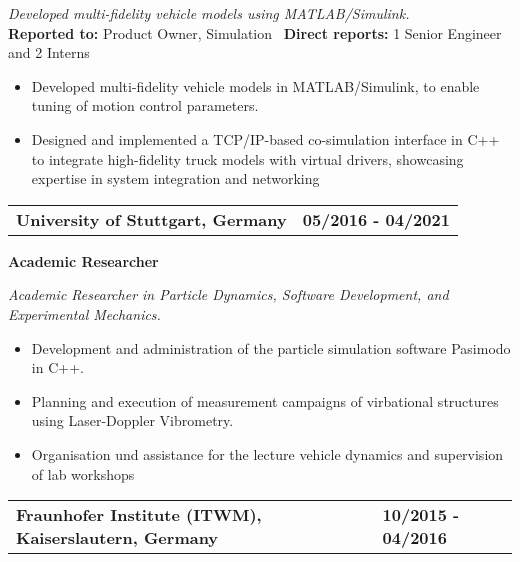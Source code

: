 \documentclass[a4paper,10pt]{article}
\begin{document}
\vspace{0.2cm}
\noindent
\textit{Developed multi-fidelity vehicle models using MATLAB/Simulink.}\\

\vspace{-0.3cm}
\noindent
\textbf{Reported to:} Product Owner, Simulation \, \textbf{Direct reports:} 1 Senior Engineer and 2 Interns\,
\begin{itemize}[itemsep=0pt, topsep=5pt]
    \item Developed multi-fidelity vehicle models in MATLAB/Simulink, to enable tuning of motion control parameters.
  \item Designed and implemented a TCP/IP-based co-simulation interface in C++ to integrate high-fidelity truck models with virtual drivers, showcasing expertise in system integration and networking
\end{itemize}

\vspace{0.3cm}
\noindent
\begin{tabular}{ @{\hskip 0pt}m{} >{\raggedleft\arraybackslash}p{} }
    \noindent\textbf{University of Stuttgart, Germany} & \textbf{05/2016 - 04/2021}
\end{tabular}

\noindent
\colorbox{gray!40}{%
    \parbox{0.99\textwidth}{%
        \textcolor{highlightcolor}{\textbf{Academic Researcher}}
    }%
}

\vspace{0.2cm}
\noindent
\textit{Academic Researcher in Particle Dynamics, Software Development, and Experimental Mechanics.}\\
\vspace{-0.4cm}
\noindent
\begin{itemize}[itemsep=0pt, topsep=5pt]
    \item Development and administration of the particle simulation
        software Pasimodo in C++.
    \item Planning and execution of measurement campaigns of
        virbational structures using Laser-Doppler Vibrometry.
    \item Organisation und assistance for the lecture vehicle
        dynamics and supervision of lab workshops
\end{itemize}

\vspace{0.3cm}
\noindent
\begin{tabular}{ @{\hskip 0pt}m{} >{\raggedleft\arraybackslash}p{} }
    \noindent\textbf{Fraunhofer Institute (ITWM), Kaiserslautern, Germany} & \textbf{10/2015 - 04/2016}
\end{tabular}
\end{document}
